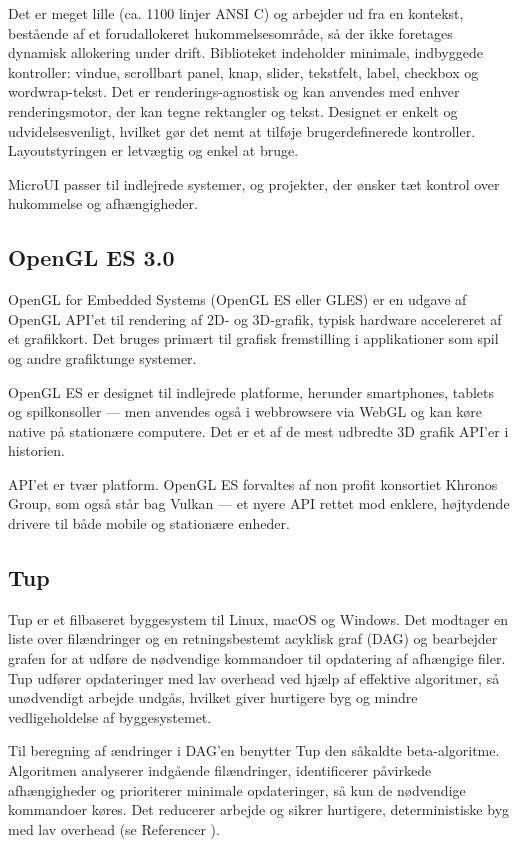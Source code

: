 \documentclass{article}
\begin{document}
Det er meget lille (ca. 1100 linjer ANSI C) og arbejder ud fra en kontekst,
bestående af et forudallokeret hukommelsesområde, så der ikke foretages
dynamisk allokering under drift. Biblioteket indeholder minimale, indbyggede
kontroller: vindue, scrollbart panel, knap, slider, tekstfelt, label,
checkbox og wordwrap-tekst. Det er renderings-agnostisk og kan anvendes med
enhver renderingsmotor, der kan tegne rektangler og tekst. Designet er
enkelt og udvidelsesvenligt, hvilket gør det nemt at tilføje
brugerdefinerede kontroller. Layoutstyringen er letvægtig og enkel at
bruge.

MicroUI passer til indlejrede systemer, og projekter,
der ønsker tæt kontrol over hukommelse og afhængigheder.

\subsection{OpenGL ES 3.0}
OpenGL for Embedded Systems (OpenGL ES eller GLES) er en udgave af
OpenGL API'et til rendering af 2D‑ og 3D‑grafik, typisk
hardware accelereret af et grafikkort. Det bruges primært til
grafisk fremstilling i applikationer som spil og andre grafiktunge
systemer.

OpenGL ES er designet til indlejrede platforme, herunder smartphones,
tablets og spilkonsoller — men anvendes også i webbrowsere via WebGL
og kan køre native på stationære computere. Det er et af de mest
udbredte 3D grafik API'er i historien.

API'et er tvær platform. OpenGL ES forvaltes af
non profit konsortiet Khronos Group, som også står bag Vulkan — et
nyere API rettet mod enklere, højtydende drivere til både mobile og
stationære enheder.

\subsection{Tup}
Tup er et filbaseret byggesystem til Linux, macOS og Windows. Det
modtager en liste over filændringer og en retningsbestemt acyklisk graf
(DAG) og bearbejder grafen for at udføre de nødvendige kommandoer til
opdatering af afhængige filer. Tup udfører opdateringer med lav
overhead ved hjælp af effektive algoritmer, så unødvendigt arbejde
undgås, hvilket giver hurtigere byg og mindre vedligeholdelse af
byggesystemet.

Til beregning af ændringer i DAG'en benytter Tup den såkaldte
beta-algoritme. Algoritmen analyserer indgående filændringer, identificerer
påvirkede afhængigheder og prioriterer minimale opdateringer, så kun
de nødvendige kommandoer køres. Det reducerer arbejde og sikrer hurtigere,
deterministiske byg med lav overhead (se Referencer \cite{tup-algorithm}).
\end{document}

